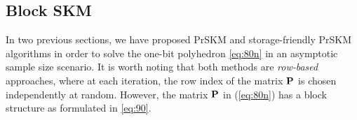 \documentclass[12pt,draftcls,onecolumn]{IEEEtran}
\begin{document}
\subsection{Block SKM}
\label{ORKA}

In two previous sections, we have proposed PrSKM and storage-friendly PrSKM algorithms in order to solve the one-bit polyhedron \eqref{eq:80n} in an asymptotic sample size scenario.
It is worth noting that both methods are
\emph{row-based} approaches, where at each iteration, the row index of the matrix $\mathbf{P}$ is chosen independently at random. However, the matrix $\mathbf{P}$ in (\ref{eq:80n}) has a block structure as formulated in \eqref{eq:90}.

\end{document}
